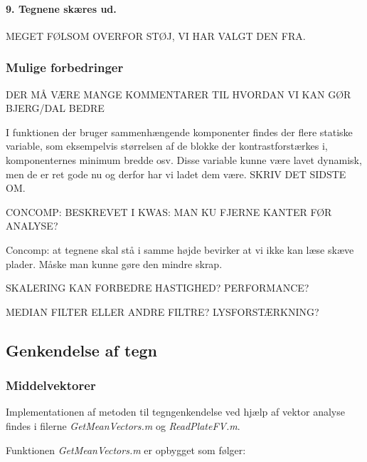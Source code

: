 \paragraph{9. Tegnene skæres ud.}


MEGET FØLSOM OVERFOR STØJ, VI HAR VALGT DEN FRA.


\subsubsection{Mulige forbedringer}
DER MÅ VÆRE MANGE KOMMENTARER TIL HVORDAN VI KAN GØR BJERG/DAL BEDRE

I funktionen der bruger sammenhængende komponenter findes der flere statiske variable, som eksempelvis størrelsen af de blokke der kontrastforstærkes i, komponenternes minimum bredde osv. Disse variable kunne være lavet dynamisk, men de er ret gode nu og derfor har vi ladet dem være. SKRIV DET SIDSTE OM.

CONCOMP: BESKREVET I KWAS: MAN KU FJERNE KANTER FØR ANALYSE?

Concomp: at tegnene skal stå i samme højde bevirker at vi ikke kan læse skæve plader. Måske man kunne gøre den mindre skrap.

SKALERING KAN FORBEDRE HASTIGHED? PERFORMANCE?

MEDIAN FILTER ELLER ANDRE FILTRE? LYSFORSTÆRKNING?



\subsection{Genkendelse af tegn}

\subsubsection{Middelvektorer}

Implementationen af metoden til tegngenkendelse ved hjælp af vektor analyse findes i filerne \textit{GetMeanVectors.m} og \textit{ReadPlateFV.m}.

Funktionen \textit{GetMeanVectors.m} er opbygget som følger:

